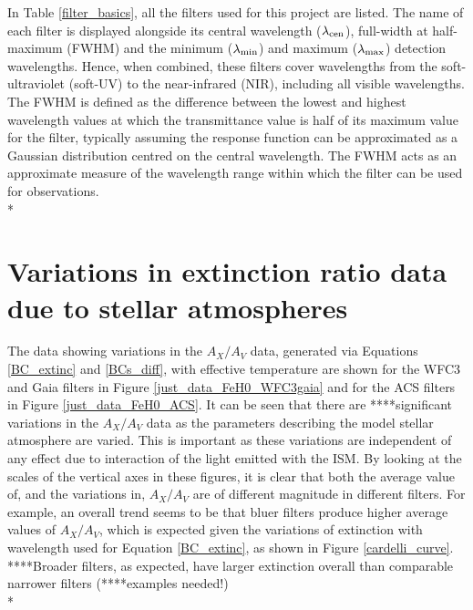 \documentclass[12pt, a4paper]{report}
\begin{document}
In Table \ref{filter_basics}, all the filters used for this project are listed. The name of each filter is displayed alongside its central wavelength ($\lambda_{\textnormal{cen}}$), full-width at half-maximum (FWHM) and the minimum ($\lambda_{\textnormal{min}}$) and maximum ($\lambda_{\textnormal{max}}$) detection wavelengths. Hence, when combined, these filters cover wavelengths from the soft-ultraviolet (soft-UV) to the near-infrared (NIR), including all visible wavelengths. The FWHM is defined as the difference between the lowest and highest wavelength values at which the transmittance value is half of its maximum value for the filter, typically assuming the response function can be approximated as a Gaussian distribution centred on the central wavelength. The FWHM acts as an approximate measure of the wavelength range within which the filter can be used for observations.\\*

\section{Variations in extinction ratio data due to stellar atmospheres} \label{desc_var}

The data showing variations in the $A_{X}/A_{V}$ data, generated via Equations \ref{BC_extinc} and \ref{BCs_diff}, with effective temperature are shown for the WFC3 and Gaia filters in Figure \ref{just_data_FeH0_WFC3gaia} and for the ACS filters in Figure \ref{just_data_FeH0_ACS}. It can be seen that there are ****significant variations in the $A_{X}/A_{V}$ data  as the parameters describing the model stellar atmosphere are varied. This is important as these variations are independent of any effect due to interaction of the light emitted with the ISM. By looking at the scales of the vertical axes in these figures, it is clear that both the average value of, and the variations in, $A_{X}/A_{V}$ are of different magnitude in different filters. For example, an overall trend seems to be that bluer filters produce higher average values of $A_{X}/A_{V}$, which is expected given the variations of extinction with wavelength used for Equation \ref{BC_extinc}, as shown in Figure \ref{cardelli_curve}. ****Broader filters, as expected, have larger extinction overall than comparable narrower filters (****examples needed!)\\*
\end{document}
